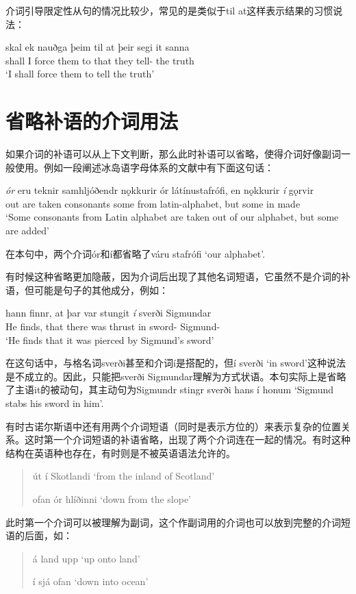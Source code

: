 介词引导限定性从句的情况比较少，常见的是类似于til at这样表示结果的习惯说法：
\begin{exe}
    \ex \gll
    skal ek nauðga þeim til at þeir segi it sanna\\
    shall I force them to that they tell-{\sub} the truth\\
    \trans `I shall force them to tell the truth'
\end{exe}

\section{省略补语的介词用法}
如果介词的补语可以从上下文判断，那么此时补语可以省略，使得介词好像副词一般使用。例如一段阐述冰岛语字母体系的文献中有下面这句话：
\begin{exe}
    \ex \gll
    \textit{ór} eru teknir samhljóðendr nǫkkurir ór látínustafrófi, en nǫkkurir \textit{í} gǫrvir\\
    out are taken consonants some from latin-alphabet, but some in made\\
    \trans `Some consonants from Latin alphabet are taken out of our alphabet, but some are added'
\end{exe}

在本句中，两个介词ór和í都省略了váru stafrófi `our alphabet'.

有时候这种省略更加隐蔽，因为介词后出现了其他名词短语，它虽然不是介词的补语，但可能是句子的其他成分，例如：
\begin{exe}
    \ex \gll
    hann finnr, at þar var stungit \textit{í} sverði Sigmundar\\
    He finds, that there was thrust in sword-{\dat} Sigmund-{\gen}\\
    \trans `He finds that it was pierced by Sigmund's sword'
\end{exe}

在这句话中，与格名词sverði甚至和介词í是搭配的，但í sverði `in sword'这种说法是不成立的。因此，只能把sverði Sigmundar理解为方式状语。本句实际上是省略了主语it的被动句，其主动句为Sigmundr stingr sverði hans í honum `Sigmund stabs his sword in him'.

有时古诺尔斯语中还有用两个介词短语（同时是表示方位的）来表示复杂的位置关系。这时第一个介词短语的补语省略，出现了两个介词连在一起的情况。有时这种结构在英语种也存在，有时则是不被英语语法允许的。
\begin{quote}
    út í Skotlandi `from the inland of Scotland'

    ofan ór hlíðinni `down from the slope'
\end{quote}

此时第一个介词可以被理解为副词，这个作副词用的介词也可以放到完整的介词短语的后面，如：
\begin{quote}
    á land upp `up onto land'

    í sjá ofan `down into ocean'
\end{quote}



